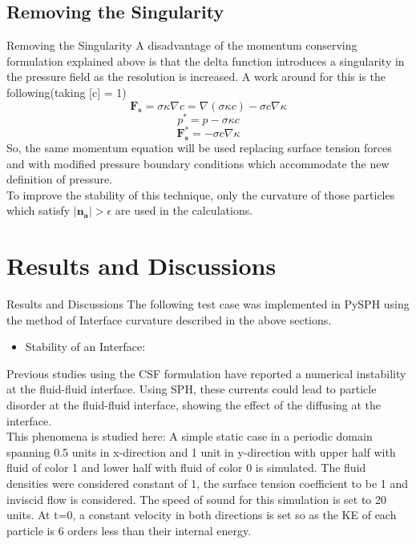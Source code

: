 \documentclass{beamer}
\begin{document}
\subsection{Removing the Singularity}
\begin{frame}{Removing the Singularity}
\justifying
A disadvantage of the momentum conserving formulation explained above is that the delta function introduces a singularity in the pressure field as the resolution is increased. 
A work around for this is the following(taking [c] = 1)
\begin{equation*}
 \mathbf{F_s} = \sigma \kappa \nabla c = \nabla(\sigma \kappa c) - \sigma c \nabla \kappa
\label{singular}
 \end{equation*}
\noindent
\begin{equation*}
 p^* = p - \sigma \kappa c
\end{equation*}
\begin{equation*}
 \mathbf{F_s^*} = - \sigma c \nabla \kappa 
 \label{surface}
\end{equation*}
\noindent
So, the same momentum equation will be used replacing surface tension forces and with modified pressure boundary conditions which accommodate the new definition of pressure.\\ 
To improve the stability of this technique, only the curvature of those particles which satisfy $\left | \mathbf{n_a}\right| > \epsilon$ are used in the calculations.\\
\end{frame}

\section{Results and Discussions}
\begin{frame}{Results and Discussions}
The following test case was implemented in PySPH using the method of Interface curvature described in the above sections. \\
\begin{itemize}
 \item Stability of an Interface:
\end{itemize}
Previous studies using the CSF formulation have reported a numerical instability at the fluid-fluid interface. 
Using SPH, these currents could lead to particle disorder at the fluid-fluid interface, showing the effect of the diffusing at the interface. \\

This phenomena is studied here: A simple static case in a periodic domain spanning 0.5 units in x-direction and 1 unit in y-direction with upper half with fluid of color 1 and lower half with fluid of color 0 is simulated. 
The fluid densities were considered constant of 1, the surface tension coefficient to be 1 and inviscid flow is considered. 
The speed of sound for this simulation is set to 20 units. 
At t=0, a constant velocity in both directions is set so as the KE of each particle is 6 orders less than their internal energy. 
\end{frame}
\end{document}

